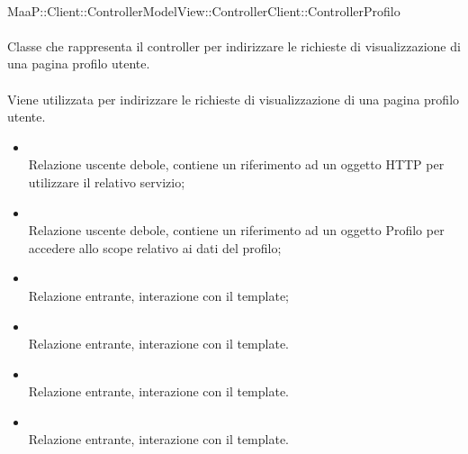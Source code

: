 	\\
	MaaP::Client::ControllerModelView::ControllerClient::ControllerProfilo\\
	\\
	Classe che rappresenta il controller per indirizzare le richieste di visualizzazione di una pagina profilo utente.\\
	\\
	Viene utilizzata per indirizzare le richieste di visualizzazione di una pagina profilo utente.\\
	\begin{itemize}
	\item{}\\
	Relazione uscente debole, contiene un riferimento ad un oggetto HTTP per utilizzare il relativo servizio;
	\item{}\\
	Relazione uscente debole, contiene un riferimento ad un oggetto Profilo per accedere allo scope relativo ai dati del profilo;
	\item{}\\
	Relazione entrante, interazione con il template;
	\item{}\\
	Relazione entrante, interazione con il template.
	\item{}\\
	Relazione entrante, interazione con il template.
	\item{}\\
	Relazione entrante, interazione con il template.
	\end{itemize}
	
